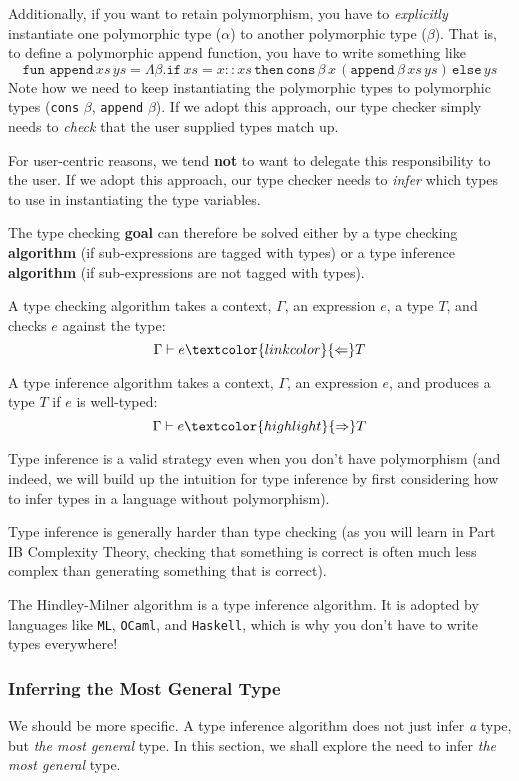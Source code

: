 {Additionally, if you want to retain polymorphism, you have to \textit{explicitly} instantiate one polymorphic type ($\alpha$) to another polymorphic type ($\beta$). That is, to define a polymorphic append function, you have to write something like
\[\texttt{fun append} \, xs \, ys = \Lambda \beta . \texttt{if} \, xs = x::xs \, \texttt{then} \, \texttt{cons} \, \beta  \, x  \, (\texttt{append}  \, \beta  \, xs  \, ys) \, \texttt{else} \, ys   \]
Note how we need to keep instantiating the polymorphic types to polymorphic types (\texttt{cons} $\beta$, \texttt{append} $\beta$). If we adopt this approach, our type checker simply needs to \textit{check} that the user supplied types match up.

For user-centric reasons, we tend \textbf{not} to want to delegate this responsibility to the user. If we adopt this approach, our type checker needs to \textit{infer} which types to use in instantiating the type variables.

The type checking \textbf{goal} can therefore be solved either by a type checking \textbf{algorithm} (if sub-expressions are tagged with types) or a type inference \textbf{algorithm} (if sub-expressions are not tagged with types).

A type checking algorithm takes a context, $\Gamma$, an expression $e$, a type $T$, and checks $e$ against the type:
\[\Gamma \vdash e \textcolor{linkcolor}{\Leftarrow} T\]

A type inference algorithm takes a context, $\Gamma$, an expression $e$, and produces a type $T$ if $e$ is well-typed:
\[\Gamma \vdash e \textcolor{highlight}{\Rightarrow} T\]

Type inference is a valid strategy even when you don't have polymorphism (and indeed, we will build up the intuition for type inference by first considering how to infer types in a language without polymorphism).

Type inference is generally harder than type checking (as you will learn in \textsf{Part IB Complexity Theory}, checking that something is correct is often much less complex than generating something that is correct).

The Hindley-Milner algorithm is a type inference algorithm. It is adopted by languages like \texttt{ML}, \texttt{OCaml}, and \texttt{Haskell}, which is why you don't have to write types everywhere!

\subsubsection{Inferring the Most General Type}
We should be more specific. A type inference algorithm does not just infer \textit{a} type, but \textit{the most general} type. In this section, we shall explore the need to infer \textit{the most general} type.

}
